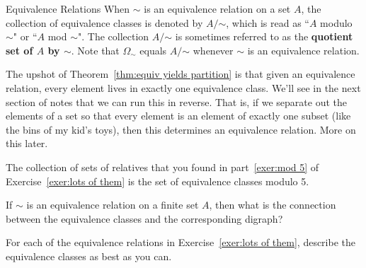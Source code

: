 \begin{section}{Equivalence Relations}
When $\sim$ is an equivalence relation on a set $A$, the collection of equivalence classes is denoted by $A/\mathord\sim$, which is read as ``$A$ modulo $\sim$" or ``$A$ mod $\sim$".  The collection $A/\mathord\sim$ is sometimes referred to as the \textbf{quotient set of $A$ by $\sim$}. Note that $\Omega_{\sim}$ equals $A/\mathord\sim$ whenever $\sim$ is an equivalence relation.

The upshot of Theorem~\ref{thm:equiv yields partition} is that given an equivalence relation, every element lives in exactly one equivalence class.  We'll see in the next section of notes that we can run this in reverse.  That is, if we separate out the elements of a set so that every element is an element of exactly one subset (like the bins of my kid's toys), then this determines an equivalence relation.  More on this later.

\begin{example}
The collection of sets of relatives that you found in part~\ref{exer:mod 5} of Exercise~\ref{exer:lots of them} is the set of equivalence classes modulo 5.
\end{example}

\begin{exercise}
If $\sim$ is an equivalence relation on a finite set $A$, then what is the connection between the equivalence classes and the corresponding digraph?
\end{exercise}

\begin{exercise}
For each of the equivalence relations in Exercise~\ref{exer:lots of them}, describe the equivalence classes as best as you can.
\end{exercise}

\end{section}